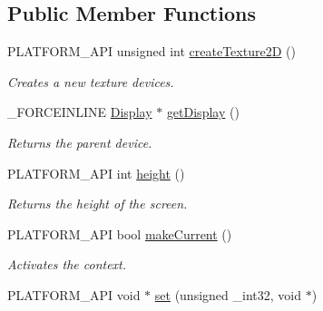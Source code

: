 \subsection*{Public Member Functions}
\begin{DoxyCompactItemize}
\item 
\hypertarget{classcsad_1_1_gl_context_a523a508de3ed4f0181f682b271f54707}{P\-L\-A\-T\-F\-O\-R\-M\-\_\-\-A\-P\-I unsigned int \hyperlink{classcsad_1_1_gl_context_a523a508de3ed4f0181f682b271f54707}{create\-Texture2\-D} ()}\label{classcsad_1_1_gl_context_a523a508de3ed4f0181f682b271f54707}

\begin{DoxyCompactList}\small\item\em Creates a new texture devices. \end{DoxyCompactList}\item 
\hypertarget{classcsad_1_1_gl_context_a74578d0e8d3e9bb788c9ac4f0f3883f0}{\-\_\-\-F\-O\-R\-C\-E\-I\-N\-L\-I\-N\-E \hyperlink{classcsad_1_1_display}{Display} $\ast$ \hyperlink{classcsad_1_1_gl_context_a74578d0e8d3e9bb788c9ac4f0f3883f0}{get\-Display} ()}\label{classcsad_1_1_gl_context_a74578d0e8d3e9bb788c9ac4f0f3883f0}

\begin{DoxyCompactList}\small\item\em Returns the parent device. \end{DoxyCompactList}\item 
\hypertarget{classcsad_1_1_gl_context_a2c2b7ecefc48c082981b562e4b0ac991}{P\-L\-A\-T\-F\-O\-R\-M\-\_\-\-A\-P\-I int \hyperlink{classcsad_1_1_gl_context_a2c2b7ecefc48c082981b562e4b0ac991}{height} ()}\label{classcsad_1_1_gl_context_a2c2b7ecefc48c082981b562e4b0ac991}

\begin{DoxyCompactList}\small\item\em Returns the height of the screen. \end{DoxyCompactList}\item 
\hypertarget{classcsad_1_1_gl_context_a2e6b41f9ad9bf94c19248eef33e7a8cf}{P\-L\-A\-T\-F\-O\-R\-M\-\_\-\-A\-P\-I bool \hyperlink{classcsad_1_1_gl_context_a2e6b41f9ad9bf94c19248eef33e7a8cf}{make\-Current} ()}\label{classcsad_1_1_gl_context_a2e6b41f9ad9bf94c19248eef33e7a8cf}

\begin{DoxyCompactList}\small\item\em Activates the context. \end{DoxyCompactList}\item 
\hypertarget{classcsad_1_1_gl_context_a1104b694664c559ed5ec6595a2cff327}{P\-L\-A\-T\-F\-O\-R\-M\-\_\-\-A\-P\-I void $\ast$ \hyperlink{classcsad_1_1_gl_context_a1104b694664c559ed5ec6595a2cff327}{set} (unsigned \-\_\-int32, void $\ast$)}\label{classcsad_1_1_gl_context_a1104b694664c559ed5ec6595a2cff327}


\end{DoxyCompactItemize}

